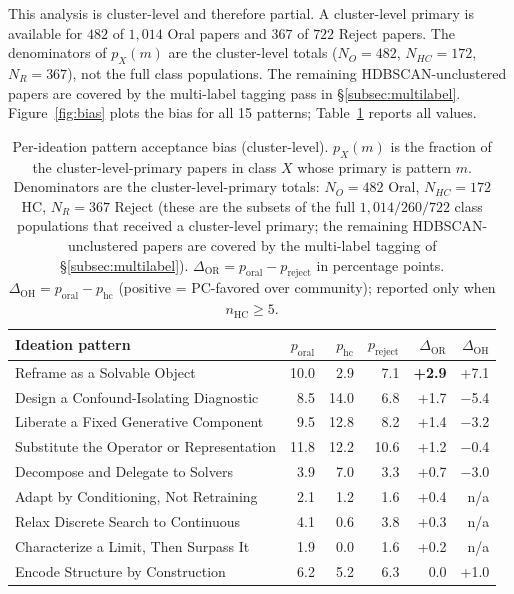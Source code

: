 \documentclass[10pt,a4paper]{article}
\begin{document}
This analysis is cluster-level and therefore partial. A cluster-level primary is available for $482$ of $1{,}014$ Oral papers and $367$ of $722$ Reject papers. The denominators of $p_X(m)$ are the cluster-level totals ($N_O = 482$, $N_{HC} = 172$, $N_R = 367$), not the full class populations. The remaining HDBSCAN-unclustered papers are covered by the multi-label tagging pass in \S\ref{subsec:multilabel}. Figure~\ref{fig:bias} plots the bias for all 15 patterns; Table~\ref{tab:bias} reports all values.

\begin{table}[!htbp]
\centering
\caption{Per-ideation pattern acceptance bias (cluster-level). $p_X(m)$ is the fraction of the cluster-level-primary papers in class $X$ whose primary is pattern $m$. Denominators are the cluster-level-primary totals: $N_O = 482$ Oral, $N_{HC} = 172$ HC, $N_R = 367$ Reject (these are the subsets of the full $1{,}014 / 260 / 722$ class populations that received a cluster-level primary; the remaining HDBSCAN-unclustered papers are covered by the multi-label tagging of \S\ref{subsec:multilabel}). $\Delta_{\text{OR}}{=}p_\text{oral}-p_\text{reject}$ in percentage points. $\Delta_{\text{OH}}{=}p_\text{oral}-p_\text{hc}$ (positive = PC-favored over community); reported only when $n_\text{HC} \geq 5$.}
\label{tab:bias}
\small
\begin{tabular}{p{6.6cm} rrrrr}
\toprule
\textbf{Ideation pattern} & \(p_\text{oral}\) & \(p_\text{hc}\) & \(p_\text{reject}\) & \(\Delta_{\text{OR}}\) & \(\Delta_{\text{OH}}\) \\
\midrule
Reframe as a Solvable Object & 10.0 & 2.9 & 7.1 & \textbf{+2.9} & +7.1 \\
Design a Confound-Isolating Diagnostic & 8.5 & 14.0 & 6.8 & +1.7 & $-$5.4 \\
Liberate a Fixed Generative Component & 9.5 & 12.8 & 8.2 & +1.4 & $-$3.2 \\
Substitute the Operator or Representation & 11.8 & 12.2 & 10.6 & +1.2 & $-$0.4 \\
Decompose and Delegate to Solvers & 3.9 & 7.0 & 3.3 & +0.7 & $-$3.0 \\
Adapt by Conditioning, Not Retraining & 2.1 & 1.2 & 1.6 & +0.4 & n/a \\
Relax Discrete Search to Continuous & 4.1 & 0.6 & 3.8 & +0.3 & n/a \\
Characterize a Limit, Then Surpass It & 1.9 & 0.0 & 1.6 & +0.2 & n/a \\
Encode Structure by Construction & 6.2 & 5.2 & 6.3 & 0.0 & +1.0 \\

\end{tabular}
\end{table}
\end{document}
